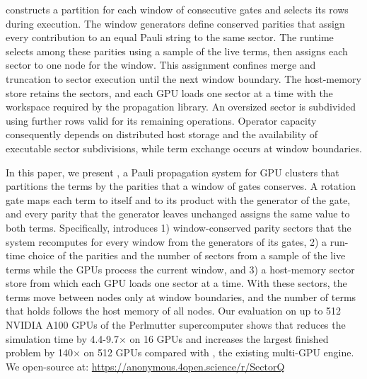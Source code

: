 \SectorQ constructs a partition for each window of consecutive gates and selects its rows during execution.
The window generators define conserved parities that assign every contribution to an equal Pauli string to the same sector.
The runtime selects among these parities using a sample of the live terms, then assigns each sector to one node for the window.
This assignment confines merge and truncation to sector execution until the next window boundary.
The host-memory store retains the sectors, and each GPU loads one sector at a time with the workspace required by the propagation library.
An oversized sector is subdivided using further rows valid for its remaining operations.
Operator capacity consequently depends on distributed host storage and the availability of executable sector subdivisions, while term exchange occurs at window boundaries.

In this paper, we present \SectorQ, a Pauli propagation system for GPU clusters that partitions the terms by the parities that a window of gates conserves.
A rotation gate maps each term to itself and to its product with the generator of the gate, and every parity that the generator leaves unchanged assigns the same value to both terms.
Specifically, \SectorQ introduces 1) window-conserved parity sectors that the system recomputes for every window from the generators of its gates, 2) a run-time choice of the parities and the number of sectors from a sample of the live terms while the GPUs process the current window, and 3) a host-memory sector store from which each GPU loads one sector at a time.
With these sectors, the terms move between nodes only at window boundaries, and the number of terms that \SectorQ holds follows the host memory of all nodes.
Our evaluation on up to 512 NVIDIA A100 GPUs of the Perlmutter supercomputer shows that \SectorQ reduces the simulation time by 4.4-9.7$\times$ on 16 GPUs and increases the largest finished problem by 140$\times$ on 512 GPUs compared with \cuPP, the existing multi-GPU engine.
We open-source \SectorQ at: \url{https://anonymous.4open.science/r/SectorQ}
